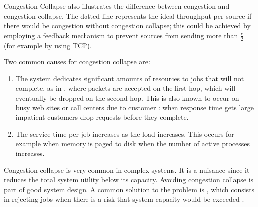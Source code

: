 \begin{ex}{Congestion Collapse}
 also illustrates the difference
between congestion and congestion collapse. The
dotted line represents the ideal throughput per
source if there would be congestion without
congestion collapse; this could be achieved by
employing a feedback mechanism to prevent sources
from sending more than $\frac{c}{2}$ (for example
by using TCP). \label{ex-cc}
\end{ex}
 Two common
causes for congestion collapse are:
\begin{enumerate}
    \item The system dedicates significant amounts of resources to jobs
    that will not complete, as in , where packets are
    accepted on the first hop, which will
    eventually be dropped on the second hop. This
    is also known to occur on busy web sites or call
    centers due to customer : when response time gets large
    impatient customers drop requests before they
    complete.
    \item The service time per job increases as
    the load increases. This occurs for example
    when memory is paged to disk when the number
    of active processes increases.
\end{enumerate}

Congestion collapse is very common in complex
systems. It is a nuisance since it reduces the
total system utility below its capacity. Avoiding
congestion collapse is part of good system
design. A common solution to the problem is
, which consists in
rejecting jobs when there is a risk that system
capacity would be exceeded \cite{boudec05}.

